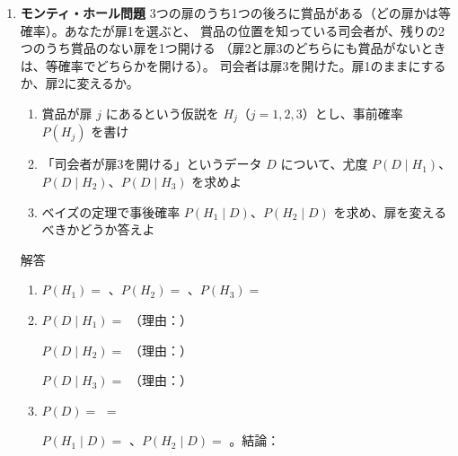 \documentclass[a4paper,dvipdfmx]{jsarticle}
\newcommand{\提出期限}{2026年11月9日（月）}
\newcommand{\学籍番号}{0000000}
\newcommand{\氏名}{氏名を書く}
\newcommand{\提出日}{2026年11月9日}
\newenvironment{answer}{\begin{itembox}[l]{解答}}{\end{itembox}}
\begin{document}
\begin{enumerate}
  \item \textbf{モンティ・ホール問題}\quad
    3つの扉のうち1つの後ろに賞品がある（どの扉かは等確率）。あなたが扉1を選ぶと、
    賞品の位置を知っている司会者が、残りの2つのうち賞品のない扉を1つ開ける
    （扉2と扉3のどちらにも賞品がないときは、等確率でどちらかを開ける）。
    司会者は扉3を開けた。扉1のままにするか、扉2に変えるか。
    \begin{enumerate}
      \item 賞品が扉 $j$ にあるという仮説を $H_j$（$j = 1, 2, 3$）とし、事前確率 $P(H_j)$ を書け
      \item 「司会者が扉3を開ける」というデータ $D$ について、尤度 $P(D \mid H_1)$、$P(D \mid H_2)$、$P(D \mid H_3)$ を求めよ
      \item ベイズの定理で事後確率 $P(H_1 \mid D)$、$P(H_2 \mid D)$ を求め、扉を変えるべきかどうか答えよ
    \end{enumerate}
    \begin{answer}
      \begin{enumerate}
        \item $P(H_1) = $ \phantom{XXX}、$P(H_2) = $ \phantom{XXX}、$P(H_3) = $ \phantom{XXX}
          \vspace{2mm}
        \item $P(D \mid H_1) = $ \phantom{XXX}（理由：\phantom{XXXXXXXXXXXXXXXX}）
          \vspace{2mm}

          $P(D \mid H_2) = $ \phantom{XXX}（理由：\phantom{XXXXXXXXXXXXXXXX}）
          \vspace{2mm}

          $P(D \mid H_3) = $ \phantom{XXX}（理由：\phantom{XXXXXXXXXXXXXXXX}）
          \vspace{2mm}
        \item $P(D) = $ \phantom{XXXXXXXXXXXXXXXX} $= $ \phantom{XXX}
          \vspace{2mm}

          $P(H_1 \mid D) = $ \phantom{XXXXXXXX}、$P(H_2 \mid D) = $ \phantom{XXXXXXXX}。結論：
          \vspace{8mm}
      \end{enumerate}
    \end{answer}


\end{enumerate}
\end{document}
